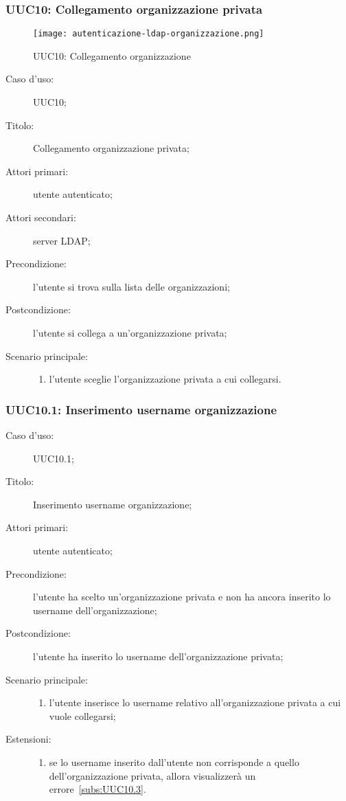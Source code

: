 \documentclass[../../../analisi-dei-requisiti.tex]{subfiles}
\begin{document}
\subsubsection{UUC10: Collegamento organizzazione privata}%
\label{subs:UUC10}

\begin{figure}[H]
  \centering
  \texttt{[image: autenticazione-ldap-organizzazione.png]}
  \caption{UUC10: Collegamento organizzazione }%
  \label{fig:UUC10}
\end{figure}

\begin{description}
  \item[Caso d'uso:] UUC10;
  \item[Titolo:] Collegamento organizzazione privata;
  \item[Attori primari:] utente autenticato;
  \item[Attori secondari:] server LDAP\@;
  \item[Precondizione:] l'utente si trova sulla lista delle organizzazioni;
  \item[Postcondizione:] l'utente si collega a un'organizzazione privata;
  \item[Scenario principale:]
        \begin{enumerate}
          \item l'utente sceglie l'organizzazione privata a cui collegarsi.
        \end{enumerate}
\end{description}

\subsubsection{UUC10.1: Inserimento username organizzazione}%
\label{subs:UUC10.1}
\begin{description}
  \item[Caso d'uso:] UUC10.1;
  \item[Titolo:] Inserimento username organizzazione;
  \item[Attori primari:] utente autenticato;
  \item[Precondizione:] l'utente ha scelto un'organizzazione privata e non ha ancora inserito lo username dell'organizzazione;
  \item[Postcondizione:] l'utente ha inserito lo username dell'organizzazione privata;
  \item[Scenario principale:]
        \begin{enumerate}
          \item l'utente inserisce lo username relativo all'organizzazione privata a cui vuole collegarsi;
        \end{enumerate}
  \item[Estensioni:]
        \begin{enumerate}
          \item se lo username inserito dall'utente non corrisponde a quello dell'organizzazione privata, allora visualizzerà un errore~\ref{subs:UUC10.3}.
        \end{enumerate}
\end{description}
\end{document}
